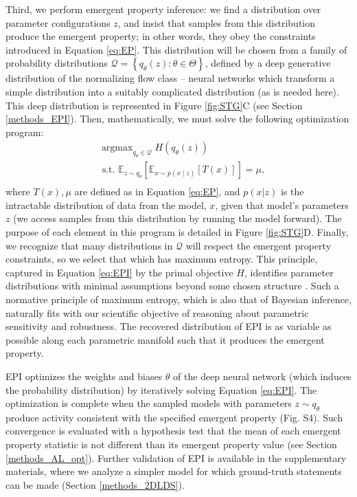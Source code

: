 \documentclass[11pt]{article}
\DeclareMathOperator*{\argmax}{argmax}
\begin{document}
Third, we perform emergent property inference: we find a distribution over parameter configurations $z$, and insist that samples from this distribution produce the emergent property; in other words, they obey the constraints introduced in Equation \ref{eq:EP}.  
This distribution will be chosen from a family of probability distributions $\mathcal{Q} = \left\{ q_\theta(z) : \theta \in \Theta \right\}$, defined by a deep generative distribution
of the normalizing flow class \cite{rezende2015variational, dinh2016density, papamakarios2017masked} -- neural networks which transform a simple distribution into a suitably complicated distribution (as is needed here).  
This deep distribution is represented in Figure \ref{fig:STG}C (see Section \ref{methods_EPI}).  
Then, mathematically, we must solve the following optimization program: 
 \begin{equation} \label{eq:EPI}
\begin{split}
&\argmax_{q_\theta \in \mathcal{Q}} H(q_\theta(z)) \\
 &\text{  s.t.  } \mathbb{E}_{z \sim q_\theta}\left[ \mathbb{E}_{x\sim p(x \mid z)}\left[T(x)\right] \right] = \mu, \\
\end{split}
\end{equation}
where $T(x), \mu$ are defined as in Equation \ref{eq:EP}, and $p(x|z)$ is the intractable distribution of data from the model, $x$, given that model's parameters $z$ (we access samples from this distribution by running the model forward).   The purpose of each element in this program is detailed in Figure \ref{fig:STG}D.
Finally, we recognize that many distributions in $\mathcal{Q}$ will respect the emergent property constraints, so we select that which has maximum entropy.
This principle, captured in Equation \ref{eq:EPI} by the primal objective $H$, identifies parameter distributions with minimal assumptions beyond some chosen structure \cite{jaynes1957information, elsayed2017structure, loaiza2017maximum, savin2017maximum}.
Such a normative principle of maximum entropy, which is also that of Bayesian inference, naturally fits with our scientific objective of reasoning about parametric sensitivity and robustness. The recovered distribution of EPI is as variable as possible along each parametric manifold such that it produces the emergent property.

EPI optimizes the weights and biases $\theta$ of the deep neural network (which induces the probability distribution) by iteratively solving Equation \ref{eq:EPI}. 
The optimization is complete when the sampled models with parameters $z \sim q_\theta$ produce activity consistent with the specified emergent property (Fig. S4).
Such convergence is evaluated with a hypothesis test that the mean of each emergent property statistic is not different than its emergent property value (see Section \ref{methods_AL_opt}). 
Further validation of EPI is available in the supplementary materials, where we analyze a simpler model for which ground-truth statements can be made (Section \ref{methods_2DLDS}).
\end{document}
